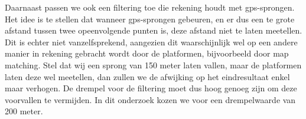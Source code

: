 Daarnaast passen we ook een filtering toe die rekening houdt met
\ac{gps}-sprongen. Het idee is te stellen dat wanneer \ac{gps}-sprongen
gebeuren, en er dus een te grote afstand tussen twee opeenvolgende punten is,
deze afstand niet te laten meetellen. Dit is echter niet vanzelfsprekend,
aangezien dit waarschijnlijk wel op een andere manier in rekening gebracht
wordt door de platformen, bijvoorbeeld door map matching. Stel dat wij een
sprong van 150 meter laten vallen, maar de platformen laten deze wel meetellen,
dan zullen we de afwijking op het eindresultaat enkel maar verhogen. De drempel
voor de filtering moet dus hoog genoeg zijn om deze voorvallen te vermijden. In
dit onderzoek kozen we voor een drempelwaarde van 200 meter.